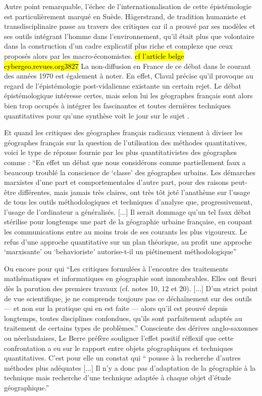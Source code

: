 Autre point remarquable, l'échec de l'internationalisation de cette épistémologie est particulièrement marqué en Suède. Hägerstrand, de tradition humaniste et transdisciplinaire \autocite{Bailly2000} passe au travers des critiques car il a prouvé par ses modèles et ses outils intégrant l'homme dans l'environnement, qu'il était plus que volontaire dans la construction d'un cadre explicatif plus riche et complexe que ceux proposés alors par les macro-économistes. \hl{cf l'article belge cybergeo.revues.org\/3827} La non-diffusion en France de ce débat dans le courant des années 1970 est également à noter. En effet, Claval précise qu'il provoque au regard de l'épistémologie post-vidalienne existante un certain rejet. Le débat épistémologique intéresse certes, mais selon lui les géographes français sont alors bien trop occupés à intégrer les fascinantes et toutes dernières techniques quantitatives pour qu'une synthèse voit le jour sur le sujet \autocite[27-29]{Claval2003}.

Et quand les critiques des géographes français radicaux viennent à diviser les géographes français sur la question de l'utilisation des méthodes quantitatives, voici le type de réponse fournie par les plus quantitativistes des géographes comme \textcite[337-338]{Pumain1983} : \enquote{En effet un débat que nous considérons comme partiellement faux a beaucoup troublé la conscience de \enquote{classe} des géographes urbains. Les démarches marxistes d'une part et comportementales d'autre part, pour des raisons peut-être différentes, mais jamais très claires, ont très tôt jeté l'anathème sur l'usage de tous les outils méthodologiques et techniques d'analyse que, progressivement, l'usage de l'ordinateur a généralisés. [...] Il serait dommage qu'un tel faux débat stérilise pour longtemps une part de la géographie urbaine française, en coupant les communications entre au moins trois de ses courants les plus vigoureux. Le refus d'une approche quantitative sur un plan théorique, au profit une approche \enquote{marxisante} ou \enquote{behavioriste} autorise-t-il un piétinement méthodologique}

Ou encore \textcite[11]{LeBerre1987} pour qui \enquote{Les critiques formulées à l'encontre des traitements mathématiques et informatiques en géographie sont innombrables. Elles ont fleuri dès la parution des premiers travaux (cf. notes 10, 12 et 20). [...] D'un strict point de vue scientifique, je ne comprends toujours pas ce déchaînement sur des outils — et non sur la pratique qui en est faite — alors qu'il est prouvé depuis longtemps, toutes disciplines confondues, qu'ils sont parfaitement adaptés au traitement de certains types de problèmes.} Consciente des dérives anglo-saxonnes ou néerlandaises, Le Berre préfère souligner l'effet positif réflexif que cette confrontation a eu sur le rapport entre objets géographiques et techniques quantitatives. C'est pour elle un constat qui \enquote{ pousse à la recherche d’autres méthodes plus adéquates [...] Il n’y a donc pas d’adaptation de la géographie à la technique mais recherche d'une technique adaptée à chaque objet d'étude géographique.}

